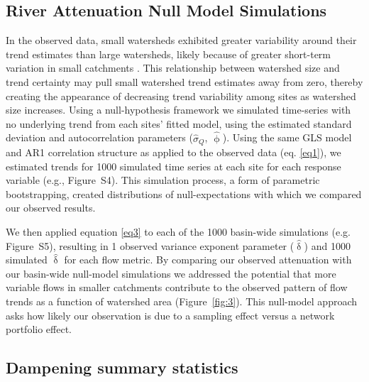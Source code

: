 \documentclass[draft,linenumbers]{AGUJournal}
\begin{document}
\subsection{River Attenuation Null Model Simulations}

In the observed data, small watersheds exhibited greater variability around their trend estimates than large watersheds, likely because of greater short-term variation in small catchments \citep{Moore:2015}. This relationship between watershed size and trend certainty may pull small watershed trend estimates away from zero, thereby creating the appearance of decreasing trend variability among sites as watershed size increases. Using a null-hypothesis framework we simulated time-series with no underlying trend from each sites' fitted model, using the estimated standard deviation and autocorrelation parameters ($\hat{\sigma}_{Q}$, $\hat{\upphi}$). Using the same GLS model and AR1 correlation structure as applied to the observed data (eq. \ref{eq1}), we estimated trends for 1000 simulated time series at each site for each response variable (e.g., Figure~S4). This simulation process, a form of parametric bootstrapping, created distributions of null-expectations with which we compared our observed results.

We then applied equation \ref{eq3} to each of the 1000 basin-wide simulations (e.g. Figure~S5), resulting in 1 observed variance exponent parameter ($\hat{\updelta}$) and 1000 simulated $\hat{\updelta}$ for each flow metric. By comparing our observed attenuation with our basin-wide null-model simulations we addressed the potential that more variable flows in smaller catchments contribute to the observed pattern of flow trends as a function of watershed area (Figure~\ref{fig:3}). This null-model approach asks how likely our observation is due to a sampling effect versus a network portfolio effect.

\subsection{Dampening summary statistics}
\end{document}
